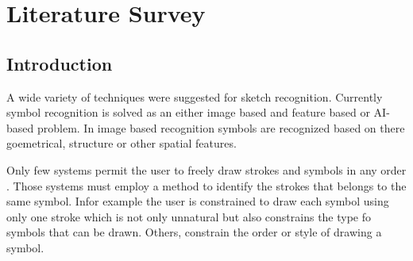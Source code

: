 \chapter{Literature Survey}


\section{Introduction }
\label{sec:Introduction}

A wide variety of techniques were suggested for sketch recognition. Currently symbol recognition is solved as an either image based and feature based or AI-based problem. In image based recognition symbols are recognized based on there goemetrical, structure or other spatial features. 




 Only few systems permit the user to freely draw strokes and symbols in any order \cite{Vibratory8,visualpattern43,Cali63,statisticalparsing26,physicalmeaning6}. Those systems must employ a method to identify the strokes that belongs to the same symbol. In\cite{gestureexample12,aideddesgin22,sketchinginterfaces2,sketchinginterfaces2,cognitivesketch18,ewhitboard9}for example the user is constrained to draw each symbol using only one stroke which is not only unnatural but also constrains the type fo symbols that can be drawn. Others, constrain the order or style of drawing a symbol\cite{}.  
 


 
 
